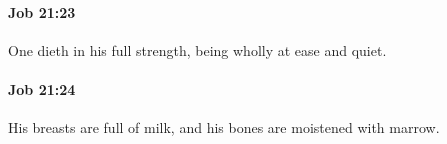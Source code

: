 		\paragraph{Job 21:23} %
			\label{JOB-21-23}

			One dieth in his full strength, being wholly at ease and quiet.


		\paragraph{Job 21:24} %
			\label{JOB-21-24}

			His breasts are full of milk, and his bones are moistened with marrow.


